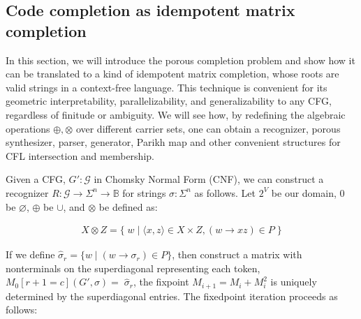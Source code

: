 \documentclass[sigplan,review,acmsmall,nonacm,anonymous]{acmart}\settopmatter{printfolios=false,printccs=false,printacmref=false}
\begin{document}
  \subsection{Code completion as idempotent matrix completion}\label{sec:matrix_completion}

  In this section, we will introduce the porous completion problem and show how it can be translated to a kind of idempotent matrix completion, whose roots are valid strings in a context-free language. This technique is convenient for its geometric interpretability, parallelizability, and generalizability to any CFG, regardless of finitude or ambiguity. We will see how, by redefining the algebraic operations $\oplus, \otimes$ over different carrier sets, one can obtain a recognizer, porous synthesizer, parser, generator, Parikh map and other convenient structures for CFL intersection and membership.

  Given a CFG, $G' : \mathcal{G}$ in Chomsky Normal Form (CNF), we can construct a recognizer $R: \mathcal{G} \rightarrow \Sigma^n \rightarrow \mathbb{B}$ for strings $\sigma: \Sigma^n$ as follows. Let $2^V$ be our domain, $0$ be $\varnothing$, $\oplus$ be $\cup$, and $\otimes$ be defined as:\vspace{-10pt}

  \begin{align}
    X \otimes Z = \big\{\;w \mid \langle x, z\rangle \in X \times Z, (w\rightarrow xz) \in P\;\big\}
  \end{align}

  \noindent If we define $\hat\sigma_r = \{w \mid (w \rightarrow \sigma_r) \in P\}$, then construct a matrix with nonterminals on the superdiagonal representing each token, $M_0[r+1=c](G', \sigma) = \;\hat\sigma_r$, the fixpoint $M_{i+1} = M_i + M_i^2$ is uniquely determined by the superdiagonal entries. The fixedpoint iteration proceeds as follows:\vspace{-10pt}
\end{document}
